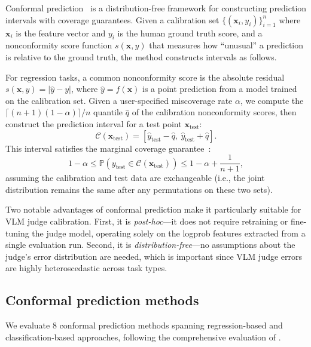 \documentclass{article}
\begin{document}
Conformal prediction~\citep{vovk2005algorithmic} is a distribution-free framework for constructing prediction intervals with coverage guarantees. Given a calibration set $\{(\mathbf{x}_i, y_i)\}_{i=1}^{n}$ where $\mathbf{x}_i$ is the feature vector and $y_i$ is the human ground truth score, and a nonconformity score function $s(\mathbf{x}, y)$ that measures how ``unusual'' a prediction is relative to the ground truth, the method constructs intervals as follows.

For regression tasks, a common nonconformity score is the absolute residual $s(\mathbf{x}, y) = |\hat{y} - y|$, where $\hat{y} = f(\mathbf{x})$ is a point prediction from a model trained on the calibration set. Given a user-specified miscoverage rate $\alpha$, we compute the $\lceil (n+1)(1-\alpha) \rceil / n$ quantile $\hat{q}$ of the calibration nonconformity scores, then construct the prediction interval for a test point $\mathbf{x}_\text{test}$:
\begin{equation}
\mathcal{C}(\mathbf{x}_\text{test}) = [\hat{y}_\text{test} - \hat{q},\ \hat{y}_\text{test} + \hat{q}].
\end{equation}
This interval satisfies the marginal coverage guarantee~\citep{angelopoulos2023gentle}:
\begin{equation}
1 - \alpha \leq \mathbb{P}(y_\text{test} \in \mathcal{C}(\mathbf{x}_\text{test})) \leq 1 - \alpha + \frac{1}{n+1},
\label{eq:coverage}
\end{equation}
assuming the calibration and test data are exchangeable (i.e., the joint distribution remains the same after any permutations on these two sets).

Two notable advantages of conformal prediction make it particularly suitable for VLM judge calibration. First, it is \emph{post-hoc}---it does not require retraining or fine-tuning the judge model, operating solely on the logprob features extracted from a single evaluation run. Second, it is \emph{distribution-free}---no assumptions about the judge's error distribution are needed, which is important since VLM judge errors are highly heteroscedastic across task types.

\subsection{Conformal prediction methods}
\label{sec:cp_methods}

We evaluate 8 conformal prediction methods spanning regression-based and classification-based approaches, following the comprehensive evaluation of \citet{sheng2025analyzing}.
\end{document}
